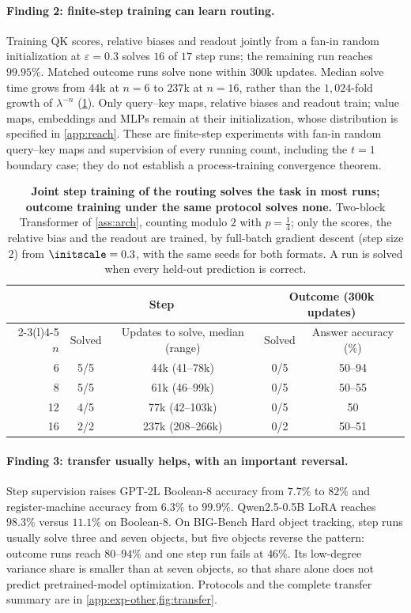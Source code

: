 \paragraph{Finding 2: finite-step training can learn routing.}
Training QK scores, relative biases and readout jointly from a fan-in random initialization
at $\varepsilon=0.3$ solves $16$ of $17$ step runs; the remaining run reaches $99.95\%$.
Matched outcome runs solve none within $300$k updates. Median solve time grows from
$44$k at $n=6$ to $237$k at $n=16$, rather than the $1{,}024$-fold growth of $\lambda^{-n}$
(\cref{tab:reach}). Only query--key maps, relative biases and readout train;
value maps, embeddings and MLPs remain at their initialization, whose distribution is specified
in \cref{app:reach}. These are finite-step experiments with fan-in random query--key
maps and supervision of every running count, including the $t=1$ boundary case;
they do not establish a process-training convergence theorem.

\begin{table}[t]
\caption{\textbf{Joint step training of the routing solves the task in most runs; outcome training under the same protocol solves
none.} Two-block Transformer of \cref{ass:arch}, counting modulo $2$ with $p=\tfrac{1}{4}$; only the scores, the relative bias and the
readout are trained, by full-batch gradient descent (step size $2$) from $\initscale=0.3$, with the same seeds for both formats. A run is
solved when every held-out prediction is correct.}
\label{tab:reach}
\centering\small
\begin{tabular}{@{}rcccc@{}}
\toprule
 & \multicolumn{2}{c}{Step} & \multicolumn{2}{c}{Outcome (300k updates)}\\
\cmidrule(lr){2-3}\cmidrule(l){4-5}
$n$ & Solved & Updates to solve, median (range) & Solved & Answer accuracy (\%)\\
\midrule
6  & 5/5 & 44k (41--78k)   & 0/5 & 50--94\\
8  & 5/5 & 61k (46--99k)   & 0/5 & 50--55\\
12 & 4/5 & 77k (42--103k)  & 0/5 & 50\\
16 & 2/2 & 237k (208--266k) & 0/2 & 50--51\\
\bottomrule
\end{tabular}
\end{table}

\paragraph{Finding 3: transfer usually helps, with an important reversal.}
Step supervision raises GPT-2L Boolean-8 accuracy from $7.7\%$ to $82\%$ and register-machine
accuracy from $6.3\%$ to $99.9\%$. Qwen2.5-0.5B LoRA reaches $98.3\%$ versus $11.1\%$
on Boolean-8. On BIG-Bench Hard object tracking, step runs usually solve three and seven
objects, but five objects reverse the pattern: outcome runs reach $80$--$94\%$ and one
step run fails at $46\%$. Its low-degree variance share is smaller than at seven objects,
so that share alone does not predict pretrained-model optimization. Protocols and the
complete transfer summary are in \cref{app:exp-other,fig:transfer}.

